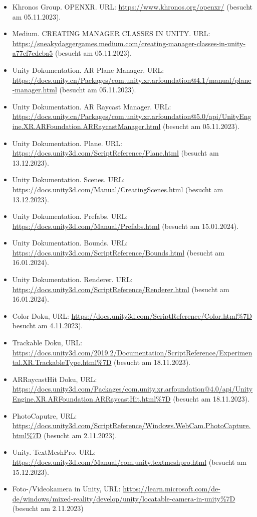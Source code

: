 \begin{itemize}
    \item Khronos Group. OPENXR. URL: \url{https://www.khronos.org/openxr/} (besucht am 05.11.2023).
    \item Medium. CREATING MANAGER CLASSES IN UNITY. URL: \url{https://sneakydaggergames.medium.com/creating-manager-classes-in-unity-a77cf7edcba5} (besucht am 05.11.2023).
    \item Unity Dokumentation. AR Plane Manager. URL: \url{https://docs.unity.cn/Packages/com.unity.xr.arfoundation@4.1/manual/plane-manager.html} (besucht am 05.11.2023).
    \item Unity Dokumentation. AR Raycast Manager. URL: \url{https://docs.unity.cn/Packages/com.unity.xr.arfoundation@5.0/api/UnityEngine.XR.ARFoundation.ARRaycastManager.html} (besucht am 05.11.2023).
    \item Unity Dokumentation. Plane. URL: \url{https://docs.unity3d.com/ScriptReference/Plane.html} (besucht am 13.12.2023).
    \item Unity Dokumentation. Scenes. URL: \url{https://docs.unity3d.com/Manual/CreatingScenes.html} (besucht am 13.12.2023).
    \item Unity Dokumentation. Prefabs. URL: \url{https://docs.unity3d.com/Manual/Prefabs.html} (besucht am 15.01.2024).
    \item Unity Dokumentation. Bounds. URL: \url{https://docs.unity3d.com/ScriptReference/Bounds.html} (besucht am 16.01.2024).
    \item Unity Dokumentation. Renderer. URL: \url{https://docs.unity3d.com/ScriptReference/Renderer.html} (besucht am 16.01.2024).
    \item Color Doku, URL:  \url{https://docs.unity3d.com/ScriptReference/Color.html%7D} besucht am 4.11.2023).
    \item Trackable Doku, URL:  \url{https://docs.unity3d.com/2019.2/Documentation/ScriptReference/Experimental.XR.TrackableType.html%7D} (besucht am 18.11.2023).
    \item ARRaycastHit Doku, URL:  \url{https://docs.unity3d.com/Packages/com.unity.xr.arfoundation@4.0/api/UnityEngine.XR.ARFoundation.ARRaycastHit.html%7D} (besucht am 18.11.2023).
    \item PhotoCaputre, URL:  \url{https://docs.unity3d.com/ScriptReference/Windows.WebCam.PhotoCapture.html%7D} (besucht am 2.11.2023).
    \item Unity. TextMeshPro. URL: \url{https://docs.unity3d.com/Manual/com.unity.textmeshpro.html} (besucht am 15.12.2023).
    \item Foto-/Videokamera in Unity, URL:  \url{https://learn.microsoft.com/de-de/windows/mixed-reality/develop/unity/locatable-camera-in-unity%7D} (besucht am 2.11.2023)

\end{itemize}
